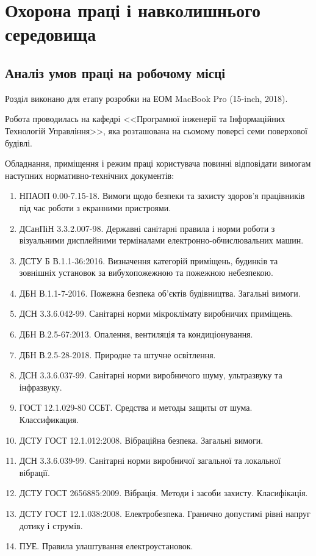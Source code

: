 \section{Охорона праці і навколишнього середовища}
\subsection{Аналіз умов праці на робочому місці}
Розділ виконано для етапу розробки на ЕОМ MacBook Pro (15-inch, 2018).

Робота проводилась на кафедрі <<Програмної інженерії та Інформаційних Технологій Управління>>, яка розташована на сьомому поверсі семи поверхової будівлі.

Обладнання, приміщення і режим праці користувача повинні відповідати вимогам наступних нормативно-технічних документів:
\begin{enumerate}
	\item НПАОП 0.00-7.15-18. Вимоги щодо безпеки та захисту здоров’я працівників під час роботи з екранними пристроями.
	\item ДСанПіН 3.3.2.007-98. Державні санітарні правила і норми роботи з візуальними дисплейними терміналами електронно-обчислювальних машин.
	\item ДСТУ Б В.1.1-36:2016. Визначення категорій приміщень, будинків та зовнішніх установок за вибухопожежною та пожежною небезпекою.
	\item ДБН В.1.1-7-2016. Пожежна безпека об’єктів будівництва. Загальні вимоги.
	\item ДСН 3.3.6.042-99. Санітарні норми мікроклімату виробничих приміщень.
	\item ДБН В.2.5-67:2013. Опалення, вентиляція та кондиціонування.
	\item ДБН В.2.5-28-2018. Природне та штучне освітлення.
	\item ДСН 3.3.6.037-99. Санітарні норми виробничого шуму, ультразвуку та інфразвуку.
	\item ГОСТ 12.1.029-80 ССБТ. Средства и методы защиты от шума. Классификация.
	\item ДСТУ ГОСТ 12.1.012:2008. Вібраційна безпека. Загальні вимоги.
	\item ДСН 3.3.6.039-99. Санітарні норми виробничої загальної та локальної вібрації.
	\item ДСТУ ГОСТ 2656885:2009. Вібрація. Методи і засоби захисту. Класифікація.
	\item ДСТУ ГОСТ 12.1.038:2008. Електробезпека. Гранично допустимі рівні напруг дотику і струмів.
	\item ПУЕ. Правила улаштування електроустановок.

\end{enumerate}
